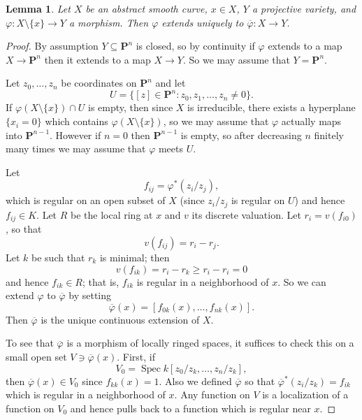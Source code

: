 \documentclass[reqno,12pt,letterpaper]{amsart}
\newcommand{\PP}{\mathbf P}
\DeclareMathOperator{\Spec}{Spec}
\newtheorem{lemma}[theorem]{Lemma}
\theoremstyle{definition}
\begin{document}
\begin{lemma}
Let $X$ be an abstract smooth curve, $x \in X$, $Y$ a projective variety, and $\varphi: X \setminus \{x\} \to Y$ a morphism.
Then $\varphi$ extends uniquely to $\overline \varphi: X \to Y$.
\end{lemma}
\begin{proof}
By assumption $Y \subseteq \PP^n$ is closed, so by continuity if $\varphi$ extends to a map $X \to \PP^n$ then it extends to a map $X \to Y$.
So we may assume that $Y = \PP^n$.

Let $z_0, \dots, z_n$ be coordinates on $\PP^n$ and let
$$U = \{[z] \in \PP^n: z_0, z_1, \dots, z_n \neq 0\}.$$
If $\varphi(X \setminus \{x\}) \cap U$ is empty, then since $X$ is irreducible, there exists a hyperplane $\{x_i = 0\}$ which contains $\varphi(X \setminus \{x\})$, so we may assume that $\varphi$ actually maps into $\PP^{n - 1}$.
However if $n = 0$ then $\PP^{n - 1}$ is empty, so after decreasing $n$ finitely many times we may assume that $\varphi$ meets $U$.

Let
$$f_{ij} = \varphi^*(z_i/z_j),$$
which is regular on an open subset of $X$ (since $z_i/z_j$ is regular on $U$) and hence $f_{ij} \in K$.
Let $R$ be the local ring at $x$ and $v$ its discrete valuation.
Let $r_i = v(f_{i0})$, so that
$$v(f_{ij}) = r_i - r_j.$$
Let $k$ be such that $r_k$ is minimal; then
$$v(f_{ik}) = r_i - r_k \geq r_i - r_i = 0$$
and hence $f_{ik} \in R$; that is, $f_{ik}$ is regular in a neighborhood of $x$.
So we can extend $\varphi$ to $\overline \varphi$ by setting
$$\overline \varphi(x) = [f_{0k}(x), \dots, f_{nk}(x)].$$
Then $\overline \varphi$ is the unique continuous extension of $X$.

To see that $\overline \varphi$ is a morphism of locally ringed spaces, it suffices to check this on a small open set $V \ni \overline \varphi(x)$.
First, if
$$V_0 = \Spec k[z_0/z_k, \dots, z_n/z_k],$$
then $\overline \varphi(x) \in V_0$ since $f_{kk}(x) = 1$.
Also we defined $\overline \varphi$ so that $\overline \varphi^*(z_i/z_k) = f_{ik}$ which is regular in a neighborhood of $x$.
Any function on $V$ is a localization of a function on $V_0$ and hence pulls back to a function which is regular near $x$.
\end{proof}
\end{document}
